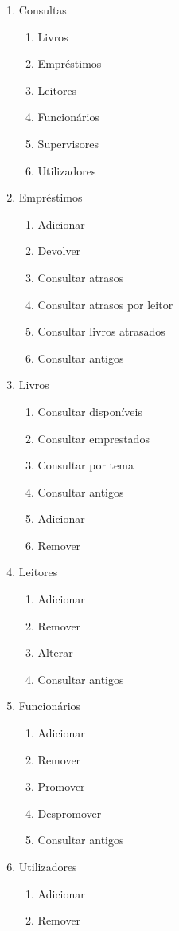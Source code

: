 \documentclass[12pt,a4paper,reqno]{report}
\numberwithin{figure}{section}
\numberwithin{equation}{section}
\begin{document}
\begin{enumerate}
  \item Consultas
  \begin{enumerate}[label*=\arabic*.]
    \item Livros
    \item Empréstimos
    \item Leitores
    \item Funcionários
    \item Supervisores
    \item Utilizadores
  \end{enumerate}
  \item Empréstimos
  \begin{enumerate}[label*=\arabic*.]
    \item Adicionar
    \item Devolver
    \item Consultar atrasos
    \item Consultar atrasos por leitor
    \item Consultar livros atrasados
    \item Consultar antigos
  \end{enumerate}
  \item Livros
  \begin{enumerate}[label*=\arabic*.]
    \item Consultar disponíveis
    \item Consultar emprestados
    \item Consultar por tema
    \item Consultar antigos
    \item Adicionar
    \item Remover
  \end{enumerate}
  \item Leitores
  \begin{enumerate}[label*=\arabic*.]
    \item Adicionar
    \item Remover
    \item Alterar
    \item Consultar antigos
  \end{enumerate}
  \item Funcionários
  \begin{enumerate}[label*=\arabic*.]
    \item Adicionar
    \item Remover
    \item Promover
    \item Despromover
    \item Consultar antigos
  \end{enumerate}
  \item Utilizadores
  \begin{enumerate}[label*=\arabic*.]
    \item Adicionar
    \item Remover
  \end{enumerate}
\end{enumerate}
\end{document}
